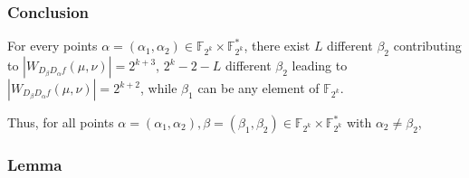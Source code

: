 \documentclass[
    aspectratio=169,                   %
]{beamer}
\newcommand{\F}{\mathbb{F}}
\newcommand{\Fn}{\mathbb{F}_{2^n}}
\newcommand{\Fks}{\mathbb{F}_{2^k}^*}
\newcommand{\Fk}{\mathbb{F}_{2^k}}
\begin{document}
    \begin{frame}
        \frametitle{Conclusion}
    
        For every points $ \alpha=(\alpha_1,\alpha_2)\in\Fk\times\Fks $, there exist $ L $ different $ \beta_2 $ 
        contributing to $ |W_{D_{\beta}D_{\alpha}f}(\mu,\nu)| = 2^{k+3} $, $ 2^k-2-L $ different $ \beta_2 $ leading 
        to  $ |W_{D_{\beta}D_{\alpha}f}(\mu,\nu)| = 2^{k+2} $, while $ \beta_1 $ can be any element of $ \Fk $. 

        Thus, for all points $ \alpha=(\alpha_1,\alpha_2),\beta=(\beta_1,\beta_2)\in\Fk\times\Fks $ with $ \alpha_2\ne\beta_2 $, 

    
    \end{frame}


    \begin{frame}
        \frametitle{Lemma}
%        
    \end{frame}
        
\end{document}
